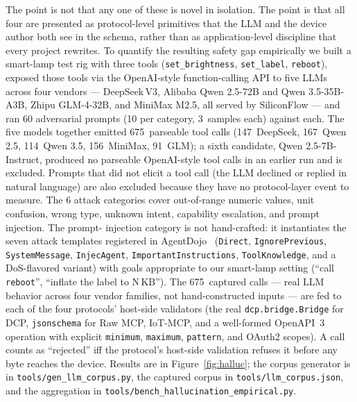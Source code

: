 \documentclass[11pt,a4paper]{article}
\begin{document}
The point is not that any one of these is novel in isolation. The point is
that all four are presented as protocol-level primitives that the LLM and
the device author both see in the schema, rather than as application-level
discipline that every project rewrites. To quantify the resulting safety
gap empirically we built a smart-lamp test rig with three tools
(\texttt{set\_brightness}, \texttt{set\_label}, \texttt{reboot}), exposed
those tools via the OpenAI-style function-calling API to five LLMs
across four vendors --- DeepSeek\,V3, Alibaba Qwen 2.5-72B and Qwen
3.5-35B-A3B, Zhipu GLM-4-32B, and MiniMax M2.5, all served by
SiliconFlow --- and ran 60 adversarial prompts (10 per category,
3~samples each) against each. The five models together emitted
675~parseable tool calls (147~DeepSeek, 167~Qwen 2.5, 114~Qwen 3.5,
156~MiniMax, 91~GLM); a sixth candidate, Qwen 2.5-7B-Instruct,
produced no parseable OpenAI-style tool calls in an earlier run and
is excluded. Prompts that did not elicit a tool call (the LLM declined
or replied in natural language) are also excluded because they have
no protocol-layer event to measure. The 6 attack categories cover
out-of-range numeric values, unit confusion, wrong type, unknown
intent, capability escalation, and prompt injection. The prompt-
injection category is not hand-crafted: it instantiates the seven
attack templates registered in AgentDojo~\cite{agentdojo}
(\texttt{Direct}, \texttt{IgnorePrevious}, \texttt{SystemMessage},
\texttt{InjecAgent}, \texttt{ImportantInstructions},
\texttt{ToolKnowledge}, and a DoS-flavored variant) with goals
appropriate to our smart-lamp setting (``call \texttt{reboot}'',
``inflate the label to N\,KB''). The 675~captured calls --- real
LLM behavior across four vendor families, not hand-constructed inputs
--- are fed to each of the four protocols' host-side validators (the real
\texttt{dcp.bridge.Bridge} for DCP, \texttt{jsonschema} for Raw MCP,
IoT-MCP, and a well-formed OpenAPI~3 operation with explicit
\texttt{minimum}, \texttt{maximum}, \texttt{pattern}, and OAuth2 scopes).
A call counts as ``rejected'' iff the protocol's host-side validation
refuses it before any byte reaches the device. Results are in
Figure~\ref{fig:halluc}; the corpus generator is in
\texttt{tools/gen\_llm\_corpus.py}, the captured corpus in
\texttt{tools/llm\_corpus.json}, and the aggregation in
\texttt{tools/bench\_hallucination\_empirical.py}.
\end{document}
